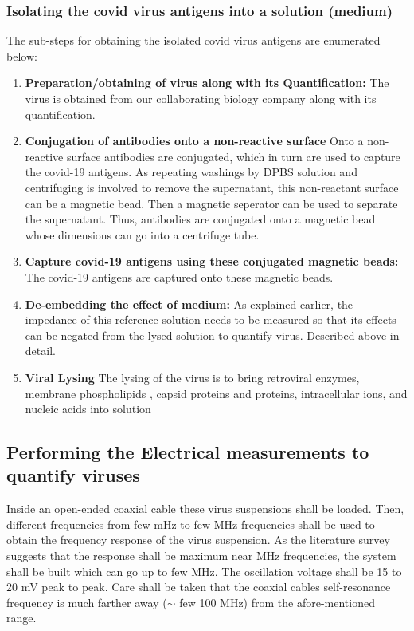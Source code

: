 \documentclass{FR16}
\begin{document}
\subsubsection{Isolating the covid virus antigens into a solution (medium)}
The sub-steps for obtaining the isolated covid virus antigens are enumerated below:
    \begin{enumerate}
        \item \textbf{Preparation/obtaining of virus along with its Quantification:} The virus is obtained from our collaborating biology company along with its quantification.
    
        \item \textbf{Conjugation of antibodies onto a non-reactive surface} Onto a non-reactive surface antibodies are conjugated, which in turn are used to capture the covid-19 antigens. As repeating washings by DPBS solution and centrifuging is involved to remove the supernatant, this non-reactant surface can be a magnetic bead. Then a magnetic seperator can be used to separate the supernatant. Thus, antibodies are conjugated onto a magnetic bead whose dimensions can go into a centrifuge tube. 
        
        \item \textbf{Capture covid-19 antigens using these conjugated magnetic beads:} The covid-19  antigens are captured onto these magnetic beads.
        
        \item \textbf{De-embedding the effect of medium:} As explained earlier, the impedance of this reference solution needs to be measured so that its effects can be negated from the lysed solution to quantify virus. Described above in detail.
        
        
        \item  \textbf{Viral Lysing} The lysing of the virus is to bring retroviral enzymes, membrane phospholipids , capsid proteins and proteins, intracellular ions,  and nucleic acids into solution
        
    \end{enumerate}


\subsection{Performing the Electrical measurements to quantify viruses} Inside an open-ended coaxial cable these virus suspensions shall be loaded. Then, different frequencies from  few mHz to few MHz frequencies shall be used to obtain the frequency response of the virus suspension. As the literature survey suggests that the response shall be maximum near MHz frequencies, the system shall be built which can go up to few MHz. The oscillation voltage shall be 15 to 20 mV peak to peak. Care shall be taken that the coaxial cables self-resonance frequency is much farther away ($\sim$ few 100 MHz) from the afore-mentioned range. 
\end{document}
